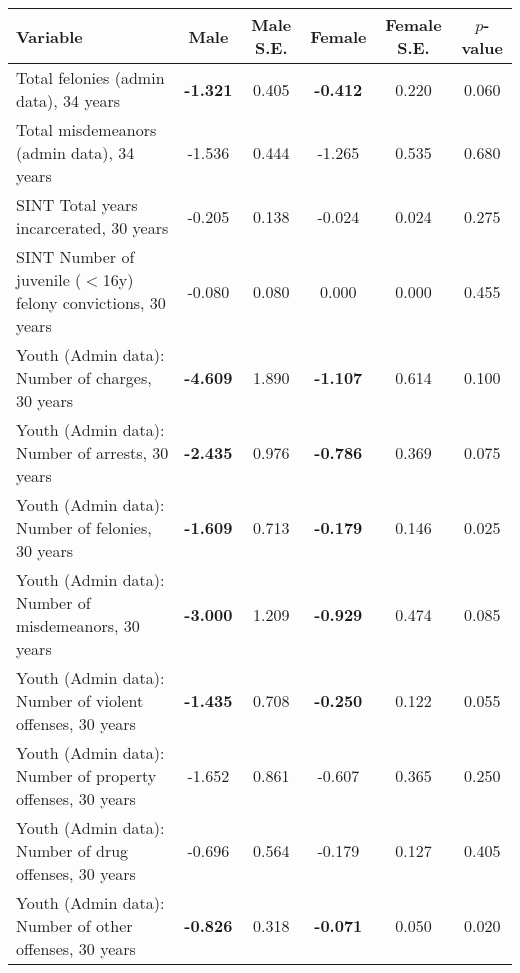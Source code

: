 \begin{tabular}{l c c c c c}
\toprule
\textbf{Variable} & \textbf{Male} & \textbf{Male S.E.}  & \textbf{Female} & \textbf{Female S.E.} & \textbf{$ p $-value} \\
\midrule
Total felonies (admin data), 34 years & \textbf{-1.321} & 0.405 &  \textbf{-0.412} & 0.220 & 0.060 \\
Total misdemeanors (admin data), 34 years & -1.536 & 0.444 &  -1.265 & 0.535 & 0.680 \\
SINT Total years incarcerated, 30 years & -0.205 & 0.138 &  -0.024 & 0.024 & 0.275 \\
SINT Number of juvenile ($ < $16y) felony convictions, 30 years & -0.080 & 0.080 &  0.000 & 0.000 & 0.455 \\
Youth (Admin data): Number of charges, 30 years & \textbf{-4.609} & 1.890 &  \textbf{-1.107} & 0.614 & 0.100 \\
Youth (Admin data): Number of arrests, 30 years & \textbf{-2.435} & 0.976 &  \textbf{-0.786} & 0.369 & 0.075 \\
Youth (Admin data): Number of felonies, 30 years & \textbf{-1.609} & 0.713 &  \textbf{-0.179} & 0.146 & 0.025 \\
Youth (Admin data): Number of misdemeanors, 30 years & \textbf{-3.000} & 1.209 &  \textbf{-0.929} & 0.474 & 0.085 \\
Youth (Admin data): Number of violent offenses, 30 years & \textbf{-1.435} & 0.708 &  \textbf{-0.250} & 0.122 & 0.055 \\
Youth (Admin data): Number of property offenses, 30 years & -1.652 & 0.861 &  -0.607 & 0.365 & 0.250 \\
Youth (Admin data): Number of drug offenses, 30 years & -0.696 & 0.564 &  -0.179 & 0.127 & 0.405 \\
Youth (Admin data): Number of other offenses, 30 years & \textbf{-0.826} & 0.318 &  \textbf{-0.071} & 0.050 & 0.020 \\
\bottomrule
\end{tabular}

